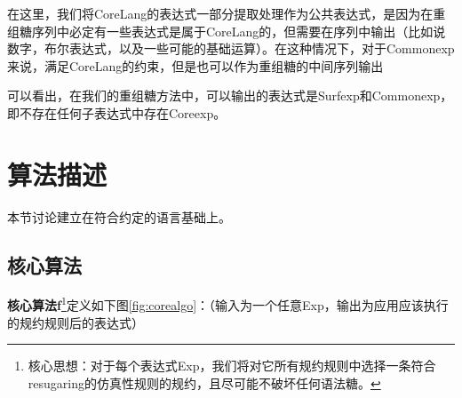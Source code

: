 在这里，我们将CoreLang的表达式一部分提取处理作为公共表达式，是因为在重组糖序列中必定有一些表达式是属于CoreLang的，但需要在序列中输出（比如说数字，布尔表达式，以及一些可能的基础运算）。在这种情况下，对于Commonexp来说，满足CoreLang的约束，但是也可以作为重组糖的中间序列输出

可以看出，在我们的重组糖方法中，可以输出的表达式是Surfexp和Commonexp，即不存在任何子表达式中存在Coreexp。


\section{算法描述}
本节讨论建立在符合约定的语言基础上。

\subsection{核心算法}

{\bfseries 核心算法f}\footnote{核心思想：对于每个表达式Exp，我们将对它所有规约规则中选择一条符合resugaring的仿真性规则的规约，且尽可能不破坏任何语法糖。}定义如下图\ref{fig:corealgo}：（输入为一个任意Exp，输出为应用应该执行的规约规则后的表达式）

